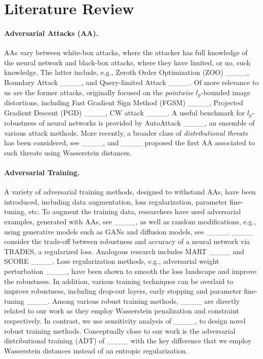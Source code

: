 \section{Literature Review}
\paragraph{Adversarial Attacks (AA).}
AAs vary between white-box attacks, where the attacker has full knowledge of the neural network and black-box attacks, where they have limited, or no, such knowledge. The latter include, e.g., Zeroth Order Optimization (ZOO) ____, Boundary Attack ____, and Query-limited Attack ____. Of more relevance to us are the former attacks, originally focused on the \emph{pointwise} \(l_{p}\)-bounded image distortions, including Fast Gradient Sign Method (FGSM) ____, Projected Gradient Descent (PGD) ____, CW attack ____. A useful benchmark for \(l_{p}\)-robustness of neural networks is provided by AutoAttack ____, an ensemble of various attack methods. More recently, a broader class of \emph{distributional threats} has been considered, see ____, and ____ proposed the first AA associated to such threats using Wasserstein distances. 

\paragraph{Adversarial Training.}
A variety of adversarial training methods, designed to withstand AAs,  have been introduced, including data augmentation, loss regularization, parameter fine-tuning, etc. 
To augment the training data, researchers have used adversarial examples, generated with AAs, see ____, as well as random modifications, e.g., using generative models such as GANs and diffusion models, see ____. 
____ consider the trade-off between robustness and accuracy of a neural network via TRADES, a regularized loss. Analogous research includes MART ____ and SCORE ____. 
Loss regularization methods, e.g., adversarial weight perturbation ____, have been shown to smooth the loss landscape and improve the robustness. 
In addition, various training techniques can be overlaid to improve robustness, including drop-out layers, early stopping and parameter fine-tuning ____.
Among various robust training methods, ____ are directly related to our work as they employ Wasserstein penalization and constraint respectively. In contrast, we use sensitivity analysis of ____, to design novel robust training methods. Conceptually close to our work is the adversarial distributional training (ADT) of ____ with the key difference that we employ Wasserstein distances instead of an entropic regularization. 


